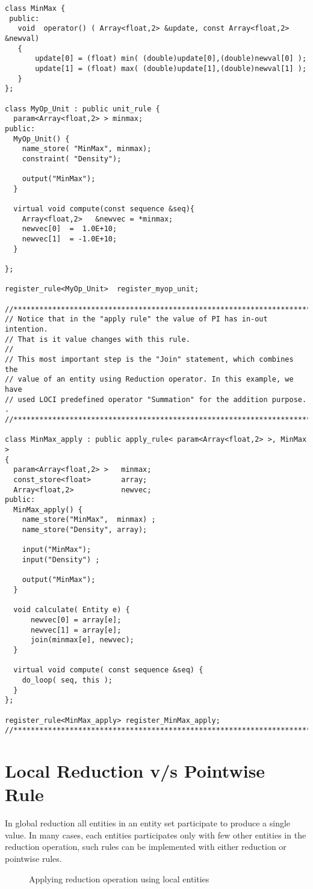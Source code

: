 \begin{verbatim}
class MinMax {
 public:
   void  operator() ( Array<float,2> &update, const Array<float,2> &newval)
   {
       update[0] = (float) min( (double)update[0],(double)newval[0] );
       update[1] = (float) max( (double)update[1],(double)newval[1] );
   }
};

class MyOp_Unit : public unit_rule {
  param<Array<float,2> > minmax;
public:
  MyOp_Unit() {
    name_store( "MinMax", minmax);
    constraint( "Density");
    
    output("MinMax");
  }

  virtual void compute(const sequence &seq){
    Array<float,2>   &newvec = *minmax;
    newvec[0]  =  1.0E+10;
    newvec[1]  = -1.0E+10;
  }

};

register_rule<MyOp_Unit>  register_myop_unit;

//*********************************************************************
// Notice that in the "apply rule" the value of PI has in-out intention.
// That is it value changes with this rule.
//
// This most important step is the "Join" statement, which combines the
// value of an entity using Reduction operator. In this example, we have
// used LOCI predefined operator "Summation" for the addition purpose. .
//*********************************************************************

class MinMax_apply : public apply_rule< param<Array<float,2> >, MinMax >
{
  param<Array<float,2> >   minmax;
  const_store<float>       array;
  Array<float,2>           newvec;
public:
  MinMax_apply() {
    name_store("MinMax",  minmax) ;
    name_store("Density", array);
    
    input("MinMax");
    input("Density") ;

    output("MinMax");
  }
  
  void calculate( Entity e) {
      newvec[0] = array[e];
      newvec[1] = array[e];
      join(minmax[e], newvec);
  }
  
  virtual void compute( const sequence &seq) {
    do_loop( seq, this );
  }
};

register_rule<MinMax_apply> register_MinMax_apply;
//*********************************************************************
\end{verbatim}
%
\section {Local Reduction v/s Pointwise Rule }
In global reduction all entities in an entity set participate to produce a single
value. In many cases, each entities participates only with few other entities in 
the reduction operation, such rules can be implemented with either reduction
or pointwise rules.
\begin{figure}[h]
\vspace{2.50in}\caption { Applying reduction operation using local entities}
\end{figure}

